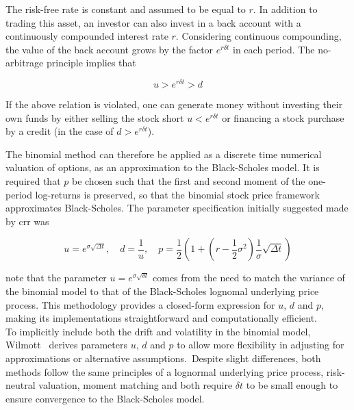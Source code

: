     The risk-free rate is constant and assumed to be equal to $r$.
    In addition to trading this asset,
    an investor can also invest in a back account with a continuously compounded interest rate $r$.
    Considering continuous compounding, the value of the back account grows by the factor $e^{r\delta t}$ in each period.
    The no-arbitrage principle implies that

    \begin{equation}
        u > e^{r\delta t} > d
        \label{eq:no_arbitrage_ud}
    \end{equation}

    If the above relation is violated, one can generate money without investing their own funds by either
    selling the stock short $ u < e^{r \delta t}$ or
    financing a stock purchase by a credit (in the case of $d > e^{r \delta t} $).

    The binomial method can therefore be applied as a discrete time numerical valuation of options,
    as an approximation to the Black-Scholes model.
    It is required that $p$ be chosen such that the first and second moment of the one-period log-returns is preserved,
    so that the binomial stock price framework approximates Black-Scholes.
    The parameter specification initially suggested made by \gls{crr} was

   \begin{equation}
        u = e^{\sigma \sqrt{\Delta t}}, \quad
        d = \frac{1}{u}, \quad
        p = \frac{1}{2} \left( 1 + \left( r - \frac{1}{2} \sigma^2 \right) \frac{1}{\sigma} \sqrt{\Delta t} \right)
        \label{eq:crr_parameters}
   \end{equation}

    note that the parameter $u=e^{\sigma \sqrt{\delta t}}$ comes from the need to match the variance of the
    binomial model to that of the Black-Scholes lognomal underlying price process.
    This methodology provides a closed-form expression for $u$, $d$ and $p$,
    making its implementations straightforward and computationally efficient. \\

    To implicitly include both the drift and volatility in the binomial model,
    Wilmott~\cite{wilmott_paul_2007} derives parameters $u$, $d$ and $p$ to allow more flexibility in adjusting
    for approximations or alternative assumptions.\ Despite slight differences,
    both methods follow the same principles of a lognormal underlying price process, risk-neutral valuation,
    moment matching and both require $\delta t$ to be small enough to ensure convergence to the Black-Scholes model.

